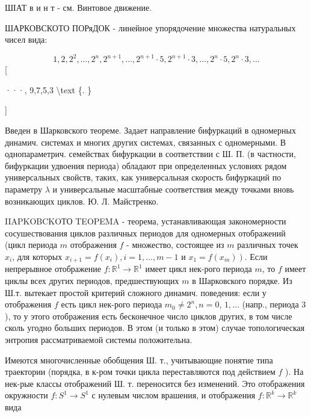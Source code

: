 \documentclass[10pt]{article}
\begin{document}
ШІАТ в и н т - см. Винтовое движение.



ШАРКОВСКОТО ПОРяДОК - линейное упорядочение множества натуральных чисел вида:



\[

1,2,2^{2}, \ldots, 2^{n}, 2^{n+1}, \ldots, 2^{n+1} \cdot 5,2^{n+1} \cdot 3, \ldots, 2^{n} \cdot 5,2^{n} \cdot 3, \ldots

\][



···, 9,7,5,3 \textbackslash text \{. \}

]



Введен в Шарковского теореме. Задает направление бифуркаций в одномерных динамич. системах и многих других системах, связанных с одномерными. В однопараметрич. семействах бифуркации в соответствии с Ш. П. (в частности, бифуркации удвоения периода) обладают при определенных условиях рядом универсальных свойств, таких, как универсальная скорость бифуркаций по параметру $\lambda$ и универсальные масштабные соответствия между точками вновь возникающих циклов. Ю. Л. Майстренко.



IIAPKOBCKOТО TEOPEMA - теорема, устанавливающая закономерности сосушествования циклов различных периодов для одномерных отображений (цикл периода $m$ отображения $f$ - множество, состоящее из $m$ различных точек $x_{i}$, для которых $x_{i+1}=f\left(x_{i}\right), i=1, \ldots, m-1$ и $\left.x_{1}=f\left(x_{m}\right)\right)$. Если непрерывное отображение $f: \mathbb{R}^{1} \rightarrow \mathbb{R}^{1}$ имеет цикл нек-рого периода $m$, то $f$ имеет циклы всех других периодов, предшествующих $m$ в Шарковского порядке. Из Ш.т. вытекает простой критерий сложного динамич. поведения: если у отображения $f$ есть цикл нек-рого периода $m_{0} \neq 2^{n}, n=0$, $1, \ldots$ (напр., периода 3 ), то у этого отображения есть бесконечное число циклов других, в том числе сколь угодно больших периодов. В этом (и только в этом) случае топологическая энтропия рассматриваемой системы положительна.



Имеются многочисленные обобщения Ш. т., учитывающие понятие типа траектории (порядка, в к-ром точки цикла переставляются под действием $f$ ). На нек-рые классы отображений Ш. т. переносится без изменений. Это отображения окружности $f: S^{1} \rightarrow S^{1}$ с нулевым числом врашения, и отображения $f: \mathbb{R}^{k} \rightarrow \mathbb{R}^{k}$ вида
\end{document}
